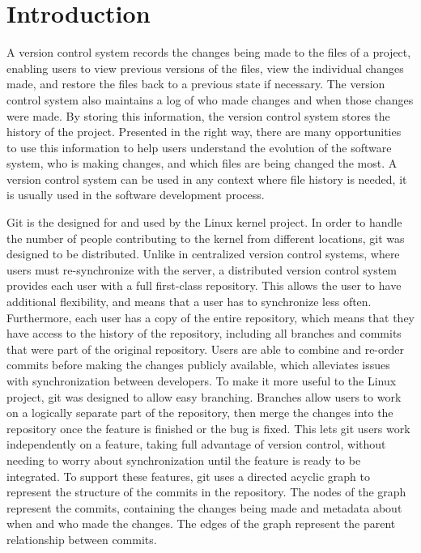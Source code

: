 \chapter{Introduction}

A version control system records the changes being made to the files of
a project,
enabling users to view previous versions of the files,
view the individual changes made,
and restore the files back to a previous state if necessary.
The version control system also maintains a log of who made changes and
when those changes were made.
By storing this information, the version control system stores the
history of the project.
Presented in the right way, there are many opportunities to use
this information to help users understand the evolution of the software
system, who is making changes, and which files are being changed the
most.
A version control system can be used in any context where file history
is needed, it is usually used in the software development process.

Git is the  designed for and used by
the Linux kernel project.
In order to handle the number of people
contributing to the kernel from different locations, git was designed to
be distributed.
Unlike in centralized version control systems, where users must
re-synchronize with the server, a distributed version control system
provides each user with a full first-class repository. This allows the
user to have additional flexibility, and means that a user has to
synchronize less often.
Furthermore, each user has a copy of the entire
repository, which means that they have access to the history of the
repository, including all branches and commits that were part of the
original repository.
Users are able to combine and re-order commits before making the changes
publicly available, which alleviates issues with synchronization between
developers.
To make it more useful to the Linux project,
git was designed to allow easy branching.
Branches allow users to work on a logically separate part of the
repository, then merge the changes into the repository once the feature
is finished or the bug is fixed.
This lets git users work independently on a feature, taking full
advantage of version control, without needing to worry about
synchronization until the feature is ready to be integrated.
To support these features, git uses a directed acyclic graph to
represent the structure of the commits in the repository.
The nodes of the graph represent the commits, containing the changes
being made and metadata about when and who made the changes.
The edges of the graph represent the parent relationship between
commits.

